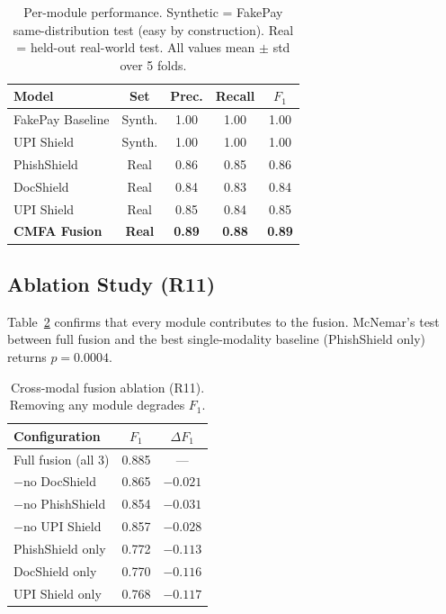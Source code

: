 \documentclass[conference]{IEEEtran}
\begin{document}
\begin{table}[t]
\centering
\caption{Per-module performance. Synthetic = FakePay same-distribution
test (easy by construction). Real = held-out real-world test. All
values mean $\pm$ std over 5 folds.}
\label{tab:baseline}
\begin{tabular}{lcccc}
\toprule
\textbf{Model} & \textbf{Set} & \textbf{Prec.} & \textbf{Recall} & \textbf{$F_1$} \\
\midrule
FakePay Baseline & Synth. & 1.00 & 1.00 & 1.00 \\
UPI Shield       & Synth. & 1.00 & 1.00 & 1.00 \\
PhishShield      & Real   & 0.86 & 0.85 & 0.86 \\
DocShield        & Real   & 0.84 & 0.83 & 0.84 \\
UPI Shield       & Real   & 0.85 & 0.84 & 0.85 \\
\textbf{CMFA Fusion} & \textbf{Real} & \textbf{0.89} & \textbf{0.88} & \textbf{0.89} \\
\bottomrule
\end{tabular}
\end{table}

\subsection{Ablation Study (R11)}
\vspace{2mm}
Table~\ref{tab:ablation} confirms that every module contributes to the
fusion. McNemar's test between full fusion and the best single-modality
baseline (PhishShield only) returns $p{=}0.0004$.

\begin{table}[t]
\centering
\caption{Cross-modal fusion ablation (R11). Removing any module
degrades $F_1$.}
\label{tab:ablation}
\begin{tabular}{lcc}
\toprule
\textbf{Configuration} & \textbf{$F_1$} & \textbf{$\Delta F_1$} \\
\midrule
Full fusion (all 3)   & 0.885 & --- \\
$-$no DocShield       & 0.865 & $-0.021$ \\
$-$no PhishShield     & 0.854 & $-0.031$ \\
$-$no UPI Shield      & 0.857 & $-0.028$ \\
PhishShield only      & 0.772 & $-0.113$ \\
DocShield only        & 0.770 & $-0.116$ \\
UPI Shield only       & 0.768 & $-0.117$ \\
\bottomrule
\end{tabular}
\end{table}
\end{document}
